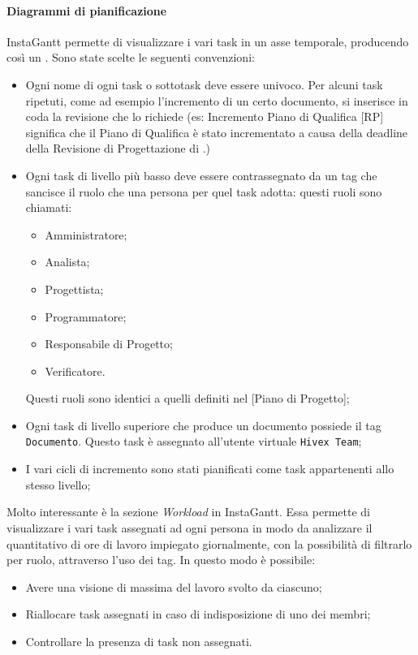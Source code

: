 \paragraph{Diagrammi di pianificazione}
InstaGantt permette di visualizzare i vari task in un asse temporale, producendo così un . 
Sono state scelte le seguenti convenzioni:
\begin{itemize}
\item Ogni nome di ogni task o sottotask deve essere univoco. Per alcuni task ripetuti, come ad esempio l'incremento di un certo documento, si inserisce in coda la revisione che lo richiede (es: Incremento Piano di Qualifica [RP] significa che il Piano di Qualifica è stato incrementato a causa della deadline della Revisione di Progettazione di \TV.)
\item Ogni task di livello più basso deve essere contrassegnato da un tag che sancisce il ruolo che una persona per quel task adotta: questi ruoli sono chiamati:
\begin{itemize}
\item Amministratore;
\item Analista;
\item Progettista;
\item Programmatore;
\item Responsabile di Progetto;
\item Verificatore.
\end{itemize}

Questi ruoli sono identici a quelli definiti nel [Piano di Progetto];

\item Ogni task di livello superiore che produce un documento possiede il tag \texttt{Documento}. Questo task è assegnato all'utente virtuale \texttt{Hivex Team};

\item I vari cicli di incremento sono stati pianificati come task appartenenti allo stesso livello;
\end{itemize}

Molto interessante è la sezione \textit{Workload} in InstaGantt.
Essa permette di visualizzare i vari task assegnati ad ogni persona in modo da analizzare il quantitativo di ore di lavoro impiegato giornalmente, con la possibilità di filtrarlo per ruolo, attraverso l'uso dei tag.
In questo modo è possibile:
\begin{itemize}
\item Avere una visione di massima del lavoro svolto da ciascuno;
\item Riallocare task assegnati in caso di indisposizione di uno dei membri;
\item Controllare la presenza di task non assegnati.
\end{itemize}

